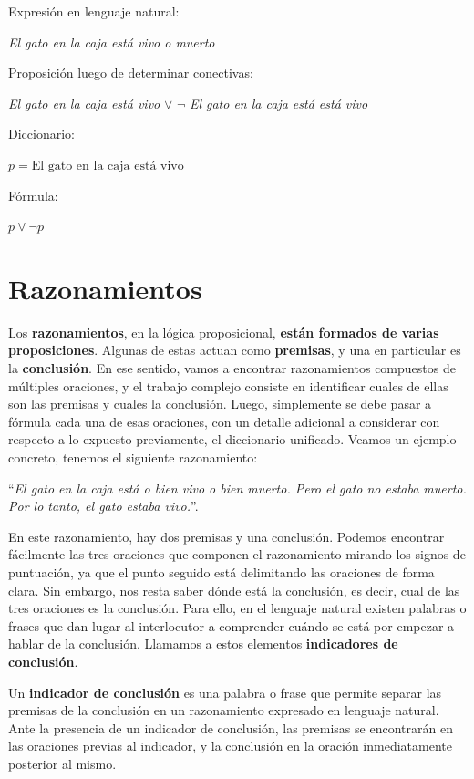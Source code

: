 \begin{example}
    \sindent Expresión en lenguaje natural:

    \dindent \textit{El gato en la caja está vivo o muerto}

    \sindent Proposición luego de determinar conectivas:

    \dindent \textit{El gato en la caja está vivo} $\lor$ $\lnot$ \textit{El
    gato en la caja está está vivo}

    \sindent Diccionario:

    \dindent $p = \text{El gato en la caja está vivo}$

    \sindent Fórmula:

    \dindent $p \lor \lnot p$
\end{example}

\section{Razonamientos}
\label{chap:logica_proposicional:sec:razonamientos}

Los \textbf{razonamientos}, en la lógica proposicional, \textbf{están formados
de varias proposiciones}. Algunas de estas actuan como \textbf{premisas}, y una
en particular es la \textbf{conclusión}. En ese sentido, vamos a encontrar
razonamientos compuestos de múltiples oraciones, y el trabajo complejo consiste
en identificar cuales de ellas son las premisas y cuales la conclusión. Luego,
simplemente se debe pasar a fórmula cada una de esas oraciones, con un detalle
adicional a considerar con respecto a lo expuesto previamente, el diccionario
unificado. Veamos un ejemplo concreto, tenemos el siguiente razonamiento:

``\textit{El gato en la caja está o bien vivo o bien muerto. Pero el gato no
estaba muerto. Por lo tanto, el gato estaba vivo.}''.

En este razonamiento, hay dos premisas y una conclusión. Podemos encontrar
fácilmente las tres oraciones que componen el razonamiento mirando los signos de
puntuación, ya que el punto seguido está delimitando las oraciones de forma
clara. Sin embargo, nos resta saber dónde está la conclusión, es decir, cual de
las tres oraciones es la conclusión. Para ello, en el lenguaje natural existen
palabras o frases que dan lugar al interlocutor a comprender cuándo se está por
empezar a hablar de la conclusión. Llamamos a estos elementos
\textbf{indicadores de conclusión}.

\begin{definition}
    Un \textbf{indicador de conclusión} es una palabra o frase que permite separar las premisas de la
    conclusión en un razonamiento expresado en lenguaje natural. Ante la
    presencia de un indicador de conclusión, las premisas se encontrarán en las
    oraciones previas al indicador, y la conclusión en la oración inmediatamente
    posterior al mismo.
\end{definition}

